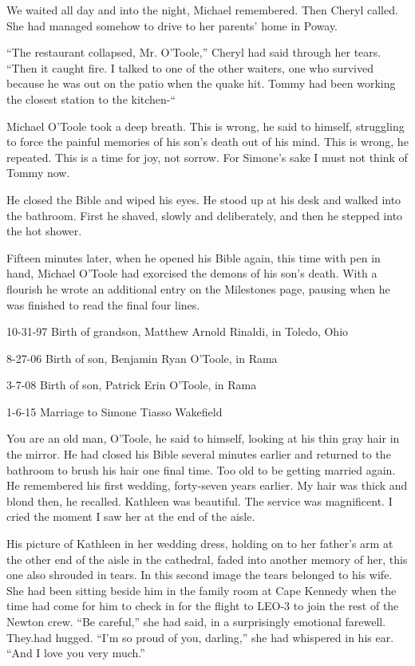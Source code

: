 \documentclass[]{article}
\begin{document}
{We waited all day and into the night, Michael remembered. Then Cheryl called. She had managed somehow to drive to her parents’ home in Poway.

“The restaurant collapsed, Mr. O’Toole,” Cheryl had said through her tears. “Then it caught fire. I talked to one of the other waiters, one who survived because he was out on the patio when the quake hit. Tommy had been working the closest station to the kitchen-“

Michael O’Toole took a deep breath. This is wrong, he said to himself, struggling to force the painful memories of his son’s death out of his mind. This is wrong, he repeated. This is a time for joy, not sorrow. For Simone’s sake I must not think of Tommy now.

He closed the Bible and wiped his eyes. He stood up at his desk and walked into the bathroom. First he shaved, slowly and deliberately, and then he stepped into the hot shower.

Fifteen minutes later, when he opened his Bible again, this time with pen in hand, Michael O’Toole had exorcised the demons of his son’s death. With a flourish he wrote an additional entry on the Milestones page, pausing when he was finished to read the final four lines.

10-31-97 Birth of grandson, Matthew Arnold Rinaldi, in Toledo, Ohio

8-27-06 Birth of son, Benjamin Ryan O’Toole, in Rama

3-7-08 Birth of son, Patrick Erin O’Toole, in Rama

1-6-15 Marriage to Simone Tiasso Wakefield

You are an old man, O’Toole, he said to himself, looking at his thin gray hair in the mirror. He had closed his Bible several minutes earlier and returned to the bathroom to brush his hair one final time. Too old to be getting married again. He remembered his first wedding, forty-seven years earlier. My hair was thick and blond then, he recalled. Kathleen was beautiful. The service was magnificent. I cried the moment I saw her at the end of the aisle.

His picture of Kathleen in her wedding dress, holding on to her father’s arm at the other end of the aisle in the cathedral, faded into another memory of her, this one also shrouded in tears. In this second image the tears belonged to his wife. She had been sitting beside him in the family room at Cape Kennedy when the time had come for him to check in for the flight to LEO-3 to join the rest of the Newton crew. “Be careful,” she had said, in a surprisingly emotional farewell. They.had hugged. “I’m so proud of you, darling,” she had whispered in his ear. “And I love you very much.”

}
\end{document}
